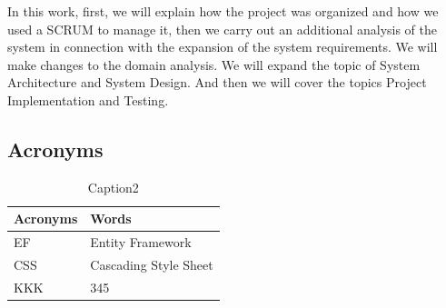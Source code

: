 \documentclass{scrartcl}
\begin{document}
 
In this work, first, we will explain how the project was organized and how we used a SCRUM to manage it, then we carry out an additional analysis of the system in connection with the expansion of the system requirements. We will make changes to the domain analysis. We will expand the topic of System Architecture and System Design. And then we will cover the topics Project Implementation and Testing.





%



\pagebreak

\subsection{Acronyms}	
\begin{table}[h]

\begin{tabular}{ p{2.5cm}| p{9.5cm} }
\rowcolor{LightCyan}
\hline
\textbf{Acronyms} & \textbf{Words} \\
\hline
EF                   &   Entity Framework\\ 
CSS      & Cascading Style Sheet \\ 
KKK      &              345\\ 
\end{tabular}
\caption{Caption2}
\label{table2}
\end{table}
\end{document}
